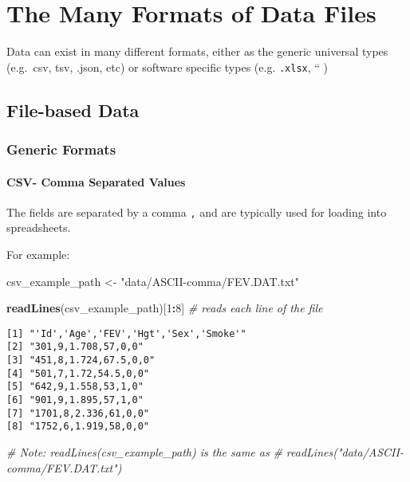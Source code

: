 \documentclass[]{book}
\newenvironment{Shaded}{\begin{snugshade}}{\end{snugshade}}
\newcommand{\KeywordTok}[1]{\textcolor[rgb]{0.13,0.29,0.53}{\textbf{#1}}}
\newcommand{\DecValTok}[1]{\textcolor[rgb]{0.00,0.00,0.81}{#1}}
\newcommand{\StringTok}[1]{\textcolor[rgb]{0.31,0.60,0.02}{#1}}
\newcommand{\CommentTok}[1]{\textcolor[rgb]{0.56,0.35,0.01}{\textit{#1}}}
\newcommand{\OperatorTok}[1]{\textcolor[rgb]{0.81,0.36,0.00}{\textbf{#1}}}
\newcommand{\NormalTok}[1]{#1}
\let\oldparagraph\paragraph
\renewcommand{\paragraph}[1]{\oldparagraph{#1}\mbox{}}
\theoremstyle{definition}
\theoremstyle{definition}
\theoremstyle{definition}
\theoremstyle{remark}
\begin{document}
\section{The Many Formats of Data
Files}\label{the-many-formats-of-data-files}

Data can exist in many different formats, either as the generic
universal types (e.g.~csv, tsv, .json, etc) or software specific types
(e.g. \texttt{.xlsx}, `` )

\subsection{File-based Data}\label{file-based-data}

\subsubsection{Generic Formats}\label{generic-formats}

\paragraph{CSV- Comma Separated
Values}\label{csv--comma-separated-values}

The fields are separated by a comma \texttt{,} and are typically used
for loading into spreadsheets.

For example:

\begin{Shaded}
\begin{Highlighting}[]
\NormalTok{csv_example_path <-}\StringTok{ "data/ASCII-comma/FEV.DAT.txt"}

\KeywordTok{readLines}\NormalTok{(csv_example_path)[}\DecValTok{1}\OperatorTok{:}\DecValTok{8}\NormalTok{]  }\CommentTok{# reads each line of the file}
\end{Highlighting}
\end{Shaded}

\begin{verbatim}
[1] "'Id','Age','FEV','Hgt','Sex','Smoke'"
[2] "301,9,1.708,57,0,0"                  
[3] "451,8,1.724,67.5,0,0"                
[4] "501,7,1.72,54.5,0,0"                 
[5] "642,9,1.558,53,1,0"                  
[6] "901,9,1.895,57,1,0"                  
[7] "1701,8,2.336,61,0,0"                 
[8] "1752,6,1.919,58,0,0"                 
\end{verbatim}

\begin{Shaded}
\begin{Highlighting}[]
\CommentTok{# Note: readLines(csv_example_path) is the same as}
\CommentTok{# readLines("data/ASCII-comma/FEV.DAT.txt")}
\end{Highlighting}
\end{Shaded}
\end{document}
